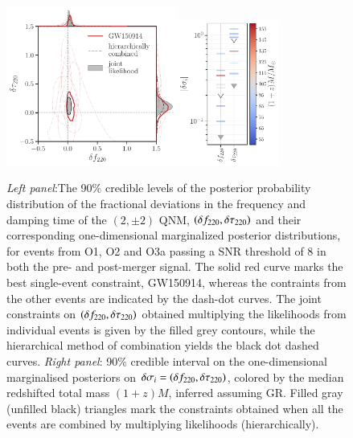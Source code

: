 \begin{figure}
        \includegraphics[width=0.5\textwidth]{figures/rin_pseob_results_v2.pdf}\includegraphics[width=0.3\textwidth]{figures/rin_all_events_bounds.pdf}
        \caption{\emph{Left panel}:The 90\% credible levels of the posterior probability distribution of the fractional deviations in the frequency and damping time of the $(2,\pm 2)$ QNM, $(\delta f_{\text{220}},\delta \tau_{\text{220}})$ and their corresponding one-dimensional marginalized posterior distributions, for events from O1, O2 and O3a passing a SNR threshold of $8$ in both the pre- and post-merger signal. The solid red curve marks the best single-event constraint, GW150914, whereas the contraints from the other events are indicated by the dash-dot curves. The joint constraints on $(\delta f_{\text{220}},\delta \tau_{\text{220}})$ obtained multiplying the likelihoods from individual events is given by the filled grey contours, while the hierarchical method of combination yields the black dot dashed curves. \emph{Right panel}: 90\% credible interval on the one-dimensional marginalised posteriors on $\delta \sigma_i=(\delta f_{\text{220}},\delta \tau_{\text{220}})$, colored by the median redshifted total mass $(1 + z)M$, inferred assuming GR. Filled gray (unfilled black) triangles mark the constraints obtained when all the events are combined by multiplying likelihoods (hierarchically).}
        \label{fig:o1o2_events}
\end{figure}



